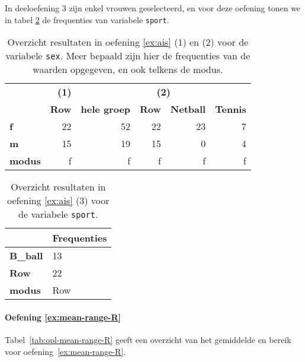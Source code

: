 In deeloefening 3 zijn enkel vrouwen geselecteerd, en voor deze oefening tonen we in tabel \ref{tab:opl-ais-sport} de frequenties van variabele \texttt{sport}.

\begin{table}
  \centering
  \begin{tabular}{@{}l|r|rrrr}
  	\toprule
  	               & \textbf{(1)} &                    \multicolumn{4}{c}{\textbf{(2)}}                     \\
  	               & \textbf{Row} & \textbf{hele groep} & \textbf{Row} & \textbf{Netball} & \textbf{Tennis} \\ \midrule
  	\textbf{f}     &           22 &                  52 &           22 &               23 &               7 \\
  	\textbf{m}     &           15 &                  19 &           15 &                0 &               4 \\
  	\textbf{modus} &            f &                   f &            f &                f &               f \\ \bottomrule
  \end{tabular}
  \caption{Overzicht resultaten in oefening \ref{ex:ais} (1) en (2) voor de variabele \texttt{sex}. Meer bepaald zijn hier de frequenties van de waarden opgegeven, en ook telkens de modus.}
  \label{tab:opl-ais-sex}
\end{table}

\begin{table}
  \centering
  \begin{tabular}{@{}l|l}
  	\toprule
  	                 & Frequenties \\ \midrule
  	\textbf{B\_ball} & 13          \\
  	\textbf{Row}     & 22          \\
  	\textbf{modus}   & Row         \\ \bottomrule
  \end{tabular}
  \caption{Overzicht resultaten in oefening \ref{ex:ais} (3) voor de variabele \texttt{sport}.}
  \label{tab:opl-ais-sport}
\end{table}


\paragraph{Oefening \ref{ex:mean-range-R}}
Tabel~\ref{tab:opl-mean-range-R} geeft een overzicht van het gemiddelde en bereik voor oefening~\ref{ex:mean-range-R}.

